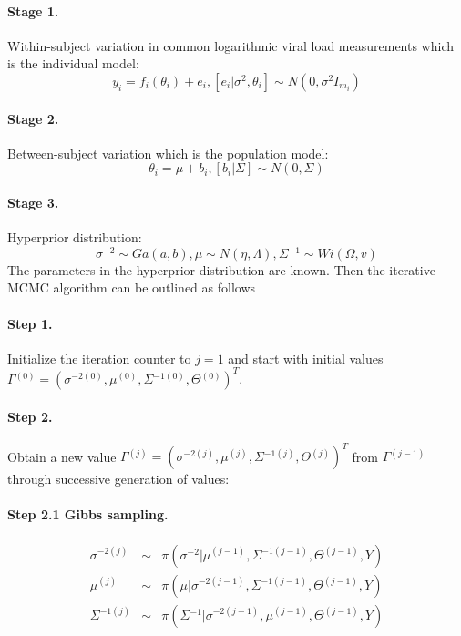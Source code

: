 \documentclass[12pt]{extarticle}
\begin{document}
\paragraph{Stage 1.}
Within-subject variation in common logarithmic viral load measurements which is the individual model:
\begin{equation}
y_{i}=f_{i}(\theta{}_{i})+e_{i}, [e_{i}|\sigma{}^{2},\theta{}_{i}]\sim{}N(0,\sigma{}^{2}I_{m_i})
\end{equation}
\paragraph{Stage 2.}
Between-subject variation which is the population model:
\begin{equation}
\theta_{i}=\mu+b_{i}, [b_{i}|\Sigma]\sim{}N(0,\Sigma)
\end{equation}
\paragraph{Stage 3.}
Hyperprior distribution:
\begin{equation}
\sigma^{-2}\sim{}Ga(a,b), \mu\sim{}N(\eta,\Lambda), \Sigma{}^{-1}\sim{}Wi(\Omega,v)
\end{equation}
The parameters in the hyperprior distribution are known. Then the iterative MCMC algorithm can be outlined as follows

\paragraph{Step 1.}
Initialize the iteration counter to $j=1$ and start with initial values $\Gamma{}^{(0)}=(\sigma{}^{-2(0)},\mu{}^{(0)},\Sigma{}^{-1(0)},\Theta{}^{(0)})^{T}$.
\paragraph{Step 2.}
Obtain a new value  $\Gamma{}^{(j)}=(\sigma{}^{-2(j)},\mu{}^{(j)},\Sigma{}^{-1(j)},\Theta{}^{(j)})^{T}$ from $\Gamma{}^{(j-1)}$ through successive generation of values:
\paragraph{Step 2.1 Gibbs sampling.}
\begin{equation}
\begin{array}{rcl}
\sigma{}^{-2(j)} & \sim{} & \pi{}(\sigma^{-2}|\mu{}^{(j-1)},\Sigma{}^{-1(j-1)},\Theta{}^{(j-1)},Y) \\
\mu{}^{(j)} & \sim{} & \pi{}(\mu{}|\sigma{}^{-2(j-1)},\Sigma{}^{-1(j-1)},\Theta{}^{(j-1)},Y) \\
\Sigma{}^{-1(j)} & \sim{} & \pi{}(\Sigma{}^{-1}|\sigma{}^{-2(j-1)},\mu{}^{(j-1)},\Theta{}^{(j-1)},Y)
\end{array}
\end{equation}
\end{document}
